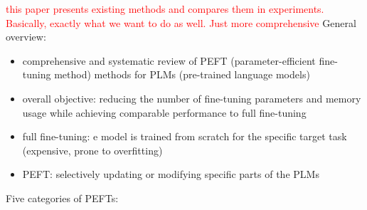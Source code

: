 \cite{xu2023parameterefficient} \textcolor{red}{this paper presents existing methods and compares them in experiments. Basically, exactly what we want to do as well. Just more comprehensive}
 General overview:
\begin{itemize}
    \item  comprehensive and systematic review of
    PEFT (parameter-efficient fine-tuning method) methods for PLMs (pre-trained language models)
    \item overall objective: reducing the number of fine-tuning parameters and memory usage while achieving comparable performance to full fine-tuning    
    \item full fine-tuning: e model is trained from scratch for the specific target task (expensive, prone to overfitting)
    \item PEFT: selectively updating or modifying specific parts of the PLMs 
\end{itemize}
Five categories of PEFTs:
